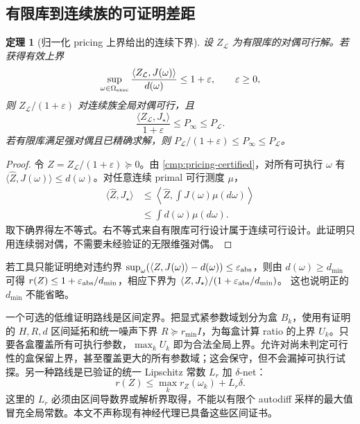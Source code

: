 \documentclass[11pt,a4paper]{article}
\numberwithin{equation}{section}
\newtheorem{theorem}{定理}[section]
\theoremstyle{definition}
\begin{document}
\subsection{有限库到连续族的可证明差距}
\label{cmp:continuous-gap}

\begin{theorem}[归一化 pricing 上界给出的连续下界]
\label{cmp:gap}
设 $Z_{\mathcal L}$ 为有限库的对偶可行解。若获得有效上界
\begin{equation}
 \sup_{\omega\in\Omega_{\rm exec}}
 \frac{\langle Z_{\mathcal L},J(\omega)\rangle}{d(\omega)}
 \le1+\varepsilon,\qquad \varepsilon\ge0,
 \label{cmp:pricing-certified}
\end{equation}
则 $Z_{\mathcal L}/(1+\varepsilon)$ 对连续族全局对偶可行，且
\begin{equation}
 \frac{\langle Z_{\mathcal L},J_\star\rangle}{1+\varepsilon}
 \le P_\infty\le P_{\mathcal L}.
 \label{cmp:global-gap}
\end{equation}
若有限库满足强对偶且已精确求解，则
$P_{\mathcal L}/(1+\varepsilon)\le P_\infty\le P_{\mathcal L}$。
\end{theorem}
\begin{proof}
令 $\widehat Z=Z_{\mathcal L}/(1+\varepsilon)\succeq0$。由 \eqref{cmp:pricing-certified}，对所有可执行 $\omega$ 有 $\langle\widehat Z,J(\omega)\rangle\le d(\omega)$。对任意连续 primal 可行测度 $\mu$，
\begin{align}
 \langle\widehat Z,J_\star\rangle
 &\le\left\langle\widehat Z,\int J(\omega)\mu(d\omega)\right\rangle\\
 &\le\int d(\omega)\mu(d\omega).
\end{align}
取下确界得左不等式。右不等式来自有限库可行设计属于连续可行设计。此证明只用连续弱对偶，不需要未经验证的无限维强对偶。
\end{proof}

若工具只能证明绝对违约界
$\sup_\omega(\langle Z,J(\omega)\rangle-d(\omega))\le\varepsilon_{\rm abs}$，则由 $d(\omega)\ge d_{\min}$ 可得
$r(Z)\le1+\varepsilon_{\rm abs}/d_{\min}$，相应下界为
$\langle Z,J_\star\rangle/(1+\varepsilon_{\rm abs}/d_{\min})$。
这也说明正的 $d_{\min}$ 不能省略。

一个可选的低维证明路线是区间定界。把显式紧参数域划分为盒 $B_k$，使用有证明的 $H,R,d$ 区间延拓和统一噪声下界 $R\succeq r_{\min}I$，为每盒计算 ratio 的上界 $U_k$。只要各盒覆盖所有可执行参数，$\max_kU_k$ 即为合法全局上界。允许对尚未判定可行性的盒保留上界，甚至覆盖更大的所有参数域；这会保守，但不会漏掉可执行试探。另一种路线是已验证的统一 Lipschitz 常数 $L_r$ 加 $\delta$-net：
\begin{equation}
 r(Z)\le\max_k r_Z(\omega_k)+L_r\delta.
\end{equation}
这里的 $L_r$ 必须由区间导数界或解析界取得，不能以有限个 autodiff 采样的最大值冒充全局常数。本文不声称现有神经代理已具备这些区间证书。
\end{document}
